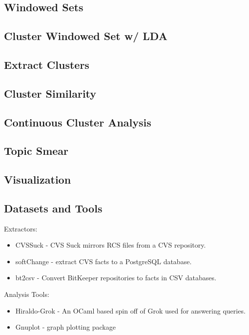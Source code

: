 \documentclass[times, 10pt,twocolumn]{article}
\begin{document}
\subsection{Windowed Sets}
\subsection{Cluster Windowed Set w/ LDA}
\subsection{Extract Clusters}
\subsection{Cluster Similarity}
\subsection{Continuous Cluster Analysis}
\subsection{Topic Smear}
\subsection{Visualization}



\subsection{Datasets and Tools}

Extractors:
\begin{itemize}
\item CVSSuck - CVS Suck mirrors RCS files from a CVS repository. 
\item softChange - extract CVS facts to a PostgreSQL database.
\item bt2csv - Convert BitKeeper repositories to facts in CSV
  databases.
\end{itemize}

Analysis Tools:
\begin{itemize}
\item Hiraldo-Grok - An OCaml based spin off of Grok used for
  answering queries.
\item Gnuplot - graph plotting package
\end{itemize}
\end{document}
